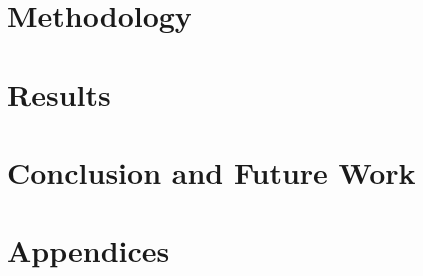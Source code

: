 \documentclass[12pt,a4paper]{report}
\begin{document}

\chapter{Methodology}\label{ch:methodology}



\chapter{Results}\label{ch:results}



\chapter{Conclusion and Future Work}\label{ch:conclusion-and-future-work}


\appendix
\chapter{Appendices}
\end{document}
